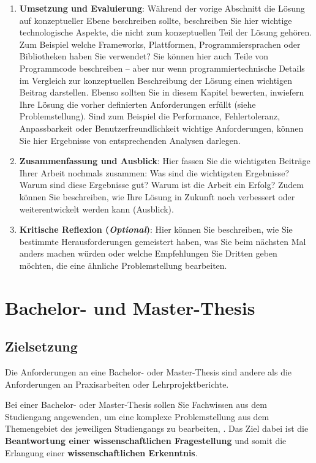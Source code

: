 \begin{enumerate}
    \item \label{struktur:umsetzung-und-evaluierung} \textbf{Umsetzung und Evaluierung}: Während der vorige Abschnitt die Lösung auf konzeptueller Ebene beschreiben sollte, beschreiben Sie hier wichtige technologische Aspekte, die nicht zum konzeptuellen Teil der Lösung gehören. Zum Beispiel welche Frameworks, Plattformen, Programmiersprachen oder Bibliotheken haben Sie verwendet? Sie können hier auch Teile von Programmcode beschreiben -- aber nur wenn programmiertechnische Details im Vergleich zur konzeptuellen Beschreibung der Lösung einen wichtigen Beitrag darstellen. Ebenso sollten Sie in diesem Kapitel bewerten, inwiefern Ihre Lösung die vorher definierten Anforderungen erfüllt (siehe Problemstellung). Sind zum Beispiel die Performance, Fehlertoleranz, Anpassbarkeit oder Benutzerfreundlichkeit wichtige Anforderungen, können Sie hier Ergebnisse von entsprechenden Analysen darlegen.
    \item \label{struktur:zusammenfassung-ausblick} \textbf{Zusammenfassung und Ausblick}: Hier fassen Sie die wichtigsten Beiträge Ihrer Arbeit nochmals zusammen: Was sind die wichtigsten Ergebnisse? Warum sind diese Ergebnisse gut? Warum ist die Arbeit ein Erfolg? Zudem können Sie beschreiben, wie Ihre Lösung in Zukunft noch verbessert oder weiterentwickelt werden kann (Ausblick). 
    \item \textbf{Kritische Reflexion (\textit{Optional})}: Hier können Sie beschreiben, wie Sie bestimmte Herausforderungen gemeistert haben, was Sie beim nächsten Mal anders machen würden oder welche Empfehlungen Sie Dritten geben möchten, die eine ähnliche Problemstellung bearbeiten.
\end{enumerate}


\section{Bachelor- und Master-Thesis}

\subsection{Zielsetzung}

Die Anforderungen an eine Bachelor- oder Master-Thesis sind andere als die Anforderungen an Praxisarbeiten oder Lehrprojektberichte.

Bei einer Bachelor- oder Master-Thesis sollen Sie Fachwissen aus dem Studiengang angewenden, um eine komplexe Problemstellung aus dem Themengebiet des jeweiligen Studiengangs zu bearbeiten, \cite{FHDWModulhabdbuchBachelor,FHDWModulhabdbuchMasterInformationEngineering}. 
Das Ziel dabei ist die \textbf{Beantwortung einer wissenschaftlichen Fragestellung} und somit die Erlangung einer \textbf{wissenschaftlichen Erkenntnis}.

